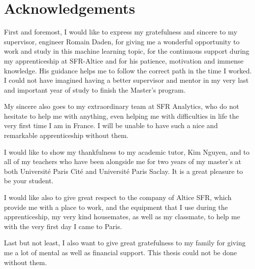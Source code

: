 \chapter*{Acknowledgements}

First and foremost, I would like to express my gratefulness and sincere to my supervisor, engineer Romain Daden, for giving me a wonderful opportunity to work and study in this machine learning topic, for the continuous support during my apprenticeship at SFR-Altice and for his patience, motivation and immense knowledge. His guidance helps me to follow the correct path in the time I worked. I could not have imagined having a better supervisor and mentor in my very last and important year of study to finish the Master's program.

My sincere also goes to my extraordinary team at SFR Analytics, who do not hesitate to help me with anything, even helping me with difficulties in life the very first time I am in France. I will be unable to have such a nice and remarkable apprenticeship without them.

I would like to show my thankfulness to my academic tutor, Kim Nguyen, and to all of my teachers who have been alongside me for two years of my master's at both Université Paris Cité and Université Paris Saclay. It is a great pleasure to be your student.

I would like also to give great respect to the company of Altice SFR, which provide me with a place to work, and the equipment that I use during the apprenticeship, my very kind housemates, as well as my classmate, to help me with the very first day I came to Paris.

Last but not least, I also want to give great gratefulness to my family for giving me a lot of mental as well as financial support. This thesis could not be done without them.



